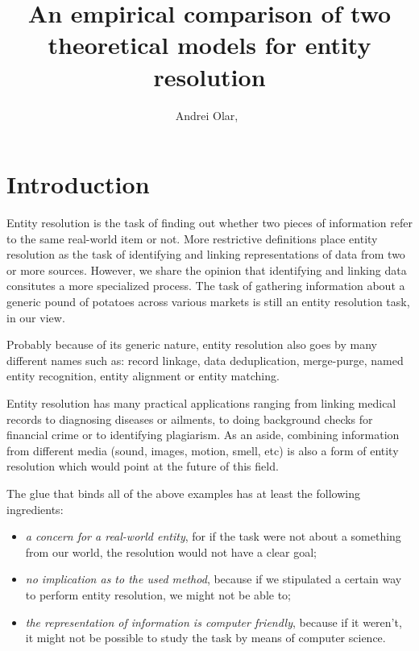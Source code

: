 \documentclass[lettersize,journal]{IEEEtran}
\begin{document}
    \title{An empirical comparison of two theoretical models for entity resolution}
    \author{Andrei Olar,~}

    \maketitle

    \theoremstyle{definition}
    \newtheorem{defn}{Definition}[section]
    
    \maketitle
    \begin{abstract}
    \end{abstract}
    \section{Introduction}\label{sec:introduction}
    Entity resolution is the task of finding out whether two pieces of
    information refer to the same real-world item or not.
    More restrictive definitions place entity resolution as the task of
    identifying and linking representations of data from two or more
    sources\cite{Qia17}.
    However, we share the opinion that identifying and linking data consitutes a
    more specialized process\cite{Tal11}.
    The task of gathering information about a generic pound of potatoes across
    various markets is still an entity resolution task, in our view.
    
    Probably because of its generic nature, entity resolution also goes by many
    different names such as: record linkage, data deduplication, merge-purge,
    named entity recognition, entity alignment or entity
    matching\cite{Tal11,fever2009}.

    Entity resolution has many practical applications ranging from linking
    medical records to diagnosing diseases or ailments, to doing background
    checks for financial crime or to identifying plagiarism.
    As an aside, combining information from different media (sound, images,
    motion, smell, etc) is also a form of entity resolution which would point at
    the future of this field.

    The glue that binds all of the above examples has at least the following
    ingredients:

    \begin{itemize}
        \item\textit{a concern for a real-world entity}, for if the task were
        not about a something from our world, the resolution would not have a
        clear goal;
        \item\textit{no implication as to the used method}, because if we
        stipulated a certain way to perform entity resolution, we might not be
        able to;
        \item\textit{the representation of information is computer friendly},
        because if it weren't, it might not be possible to study the task by
        means of computer science.
    \end{itemize}
\end{document}
